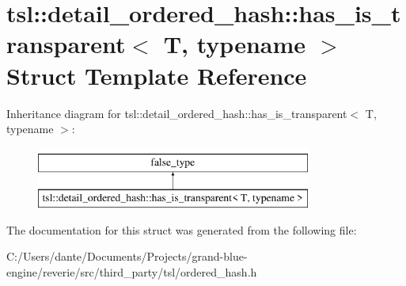 \hypertarget{structtsl_1_1detail__ordered__hash_1_1has__is__transparent}{}\section{tsl\+::detail\+\_\+ordered\+\_\+hash\+::has\+\_\+is\+\_\+transparent$<$ T, typename $>$ Struct Template Reference}
\label{structtsl_1_1detail__ordered__hash_1_1has__is__transparent}
Inheritance diagram for tsl\+::detail\+\_\+ordered\+\_\+hash\+::has\+\_\+is\+\_\+transparent$<$ T, typename $>$\+:\begin{figure}[H]
\begin{center}
\leavevmode
\includegraphics[height=2.000000cm]{structtsl_1_1detail__ordered__hash_1_1has__is__transparent}
\end{center}
\end{figure}


The documentation for this struct was generated from the following file\+:\begin{DoxyCompactItemize}
\item 
C\+:/\+Users/dante/\+Documents/\+Projects/grand-\/blue-\/engine/reverie/src/third\+\_\+party/tsl/ordered\+\_\+hash.\+h\end{DoxyCompactItemize}
